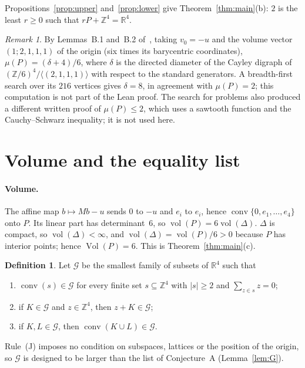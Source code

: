\documentclass[11pt]{article}
\theoremstyle{definition}
\newtheorem{definition}{Definition}
\theoremstyle{remark}
\newtheorem{remark}{Remark}
\newcommand{\R}{\mathbb R}
\newcommand{\Z}{\mathbb Z}
\newcommand{\conv}{\operatorname{conv}}
\newcommand{\Vol}{\operatorname{Vol}}
\newcommand{\vol}{\operatorname{vol}}
\newcommand{\G}{\mathcal G}
\begin{document}
\noindent Propositions~\ref{prop:upper} and~\ref{prop:lower} give
Theorem~\ref{thm:main}(b): $2$ is the least $r\ge0$ such that
$rP+\Z^4=\R^4$.

\begin{remark}\label{rem:cayley}
By Lemmas~B.1 and~B.2 of~\cite{css}, taking $v_0=-u$ and the volume vector
$(1;2,1,1,1)$ of the origin (six times its barycentric coordinates),
$\mu(P)=(\delta+4)/6$, where $\delta$ is the directed diameter of the Cayley
digraph of $(\Z/6)^4/\langle(2,1,1,1)\rangle$ with respect to the standard
generators. A breadth-first search over its
$216$ vertices gives $\delta=8$, in agreement with $\mu(P)=2$; this computation
is not part of the Lean proof. The search for problems also produced a
different written proof of $\mu(P)\le2$, which uses a sawtooth function and
the Cauchy--Schwarz inequality; it is not used here.
\end{remark}

\section{Volume and the equality list}\label{sec:list}

\paragraph{Volume.} The affine map $b\mapsto Mb-u$ sends $0$ to $-u$ and $e_i$
to $e_i$, hence $\conv\{0,e_1,\dots,e_4\}$ onto $P$. Its linear part has
determinant~$6$, so $\vol(P)=6\vol(\Delta)$. $\Delta$ is compact, so $\vol(\Delta)<\infty$,
and $\vol(\Delta)=\vol(P)/6>0$ because $P$ has interior points; hence $\Vol(P)=6$. This is
Theorem~\ref{thm:main}(c).

\begin{definition}\label{def:G}
Let $\G$ be the smallest family of subsets of $\R^4$ such that
\begin{enumerate}
\item[(L)] $\conv(s)\in\G$ for every finite set $s\subseteq\Z^4$ with
$|s|\ge2$ and $\sum_{z\in s}z=0$;
\item[(T)] if $K\in\G$ and $z\in\Z^4$, then $z+K\in\G$;
\item[(J)] if $K,L\in\G$, then $\conv(K\cup L)\in\G$.
\end{enumerate}
\end{definition}

\noindent Rule~(J) imposes no condition on subspaces, lattices or the
position of the origin, so $\G$ is designed to be larger than the list of
Conjecture~A (Lemma~\ref{lem:G}).
\end{document}
